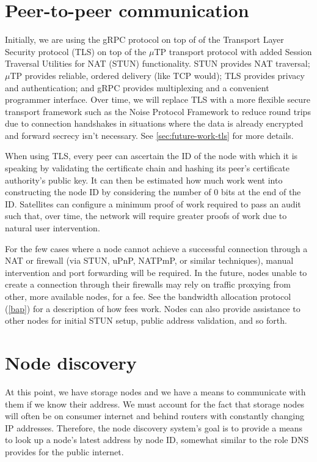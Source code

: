 \documentclass[11pt,fleqn,openany]{book}
\begin{document}
\section{Peer-to-peer communication}

Initially, we are using the gRPC \cite{grpc} protocol on top of of the
Transport Layer Security protocol (TLS) on top of the $\mu$TP
\cite{utp} transport protocol with added Session Traversal Utilities for NAT
(STUN) functionality. STUN provides NAT traversal; $\mu$TP provides reliable,
ordered delivery (like TCP would); TLS provides privacy and authentication;
and gRPC provides multiplexing and a convenient programmer interface.
Over time, we will replace TLS with a more flexible secure transport
framework such as the Noise Protocol Framework \cite{noise-proto} to
reduce round trips due to connection handshakes in situations where the data is
already encrypted and forward secrecy isn't necessary. See
\ref{sec:future-work-tls} for more details.

When using TLS, every peer can ascertain the ID of the node with which it is
speaking by validating the certificate chain and hashing its peer's
certificate authority's public key. It can then be estimated how much work went
into constructing the node ID by considering the number of 0 bits at the end of
the ID. Satellites can configure a minimum proof of work required to pass an
audit such that, over time, the network will require greater proofs of work
due to natural user intervention.

For the few cases where a node cannot achieve a successful connection through a
NAT or firewall (via STUN, uPnP, NATPmP, or similar techniques), manual
intervention and port forwarding will be required. In the future, nodes unable
to create a connection through their firewalls may rely on traffic proxying from
other, more available nodes, for a fee. See the bandwidth allocation protocol
(\ref{bap}) for a description of how fees work. Nodes can also provide
assistance to other nodes for initial STUN setup, public address validation,
and so forth.

\section{Node discovery}\label{sec:concrete-node-discovery}

At this point, we have storage nodes and we have a means to communicate with
them if we know their address. We must account for the fact that storage nodes
will often be on consumer internet and behind routers with constantly changing IP
addresses. Therefore, the node discovery system's goal is to provide a means to look
up a node's latest address by node ID, somewhat similar to the role DNS
provides for the public internet.
\end{document}
